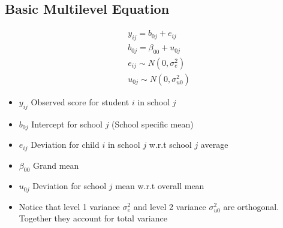 \subsection{Basic Multilevel Equation} 
\begin{align*}
    & y_{ij} = b_{0j} + e_{ij} \\
    & b_{0j} = \beta_{00} + u_{0j}\\
    & e_{ij} \sim N(0, \sigma_e^2) \\
    & u_{0j} \sim N(0, \sigma_{u0}^2)
\end{align*}
\begin{itemize}
    \item $y_{ij}$ Observed score for student $i$ in school $j$
    \item $b_{0j}$ Intercept for school $j$ (School specific mean) 
    \item $e_{ij}$ Deviation for child $i$ in school $j$ w.r.t school $j$ average 
    \item $\beta_{00}$ Grand mean 
    \item $u_{0j}$ Deviation for school $j$ mean w.r.t overall mean
    \item Notice that level 1 variance $\sigma_e^2$ and level 2 variance $\sigma_{u0}^2$ are orthogonal. Together they account for total variance
\end{itemize}

